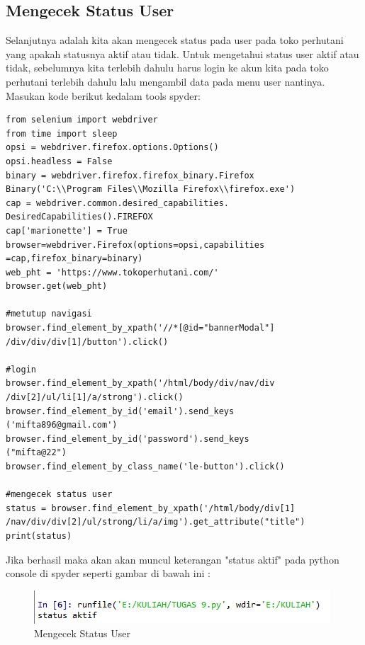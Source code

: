 \subsection{Mengecek Status User}
Selanjutnya adalah kita akan mengecek status pada user pada toko perhutani yang apakah statusnya aktif atau tidak. Untuk mengetahui status user aktif atau tidak, sebelumnya kita terlebih dahulu harus login ke akun kita pada toko perhutani terlebih dahulu lalu mengambil data pada menu user nantinya.
Masukan kode berikut kedalam tools spyder:
\begin{verbatim}
from selenium import webdriver
from time import sleep
opsi = webdriver.firefox.options.Options()
opsi.headless = False
binary = webdriver.firefox.firefox_binary.Firefox
Binary('C:\\Program Files\\Mozilla Firefox\\firefox.exe')
cap = webdriver.common.desired_capabilities.
DesiredCapabilities().FIREFOX
cap['marionette'] = True
browser=webdriver.Firefox(options=opsi,capabilities
=cap,firefox_binary=binary)
web_pht = 'https://www.tokoperhutani.com/'
browser.get(web_pht)

#metutup navigasi
browser.find_element_by_xpath('//*[@id="bannerModal"]
/div/div/div[1]/button').click()

#login
browser.find_element_by_xpath('/html/body/div/nav/div
/div[2]/ul/li[1]/a/strong').click()
browser.find_element_by_id('email').send_keys
('mifta896@gmail.com')
browser.find_element_by_id('password').send_keys
("mifta@22")
browser.find_element_by_class_name('le-button').click()

#mengecek status user
status = browser.find_element_by_xpath('/html/body/div[1]
/nav/div/div[2]/ul/strong/li/a/img').get_attribute("title")
print(status)
\end{verbatim}

\newpage
Jika berhasil maka akan akan muncul keterangan "status aktif" pada python console di spyder seperti gambar di bawah ini :
\begin{figure}[h]
	\centering
	\includegraphics[scale=0.8]{figures/status_user_aktif}
	\caption{Mengecek Status User}
\end{figure}

\newpage
